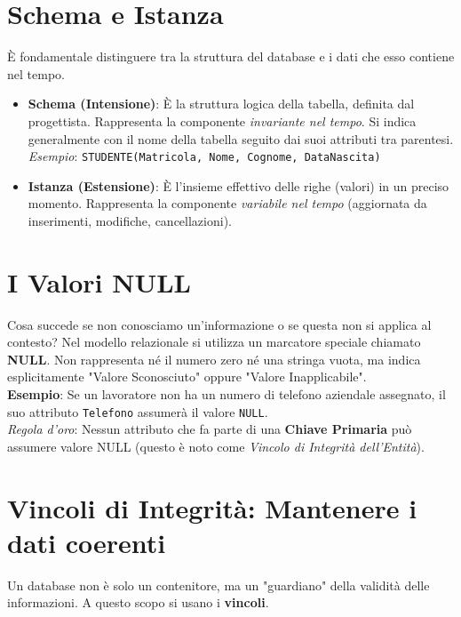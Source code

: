 \section{Schema e Istanza}
È fondamentale distinguere tra la struttura del database e i dati che esso contiene nel tempo.

\begin{itemize}
    \item \textbf{Schema (Intensione)}: È la struttura logica della tabella, definita dal progettista. Rappresenta la componente \textit{invariante nel tempo}. Si indica generalmente con il nome della tabella seguito dai suoi attributi tra parentesi.
    \\[0.1cm] \textit{Esempio}: \texttt{STUDENTE(Matricola, Nome, Cognome, DataNascita)}
    
    \item \textbf{Istanza (Estensione)}: È l'insieme effettivo delle righe (valori) in un preciso momento. Rappresenta la componente \textit{variabile nel tempo} (aggiornata da inserimenti, modifiche, cancellazioni).
\end{itemize}

\section{I Valori NULL}
Cosa succede se non conosciamo un'informazione o se questa non si applica al contesto? Nel modello relazionale si utilizza un marcatore speciale chiamato \textbf{NULL}.
Non rappresenta né il numero zero né una stringa vuota, ma indica esplicitamente "Valore Sconosciuto" oppure "Valore Inapplicabile".
\\[0.2cm]
\textbf{Esempio}: Se un lavoratore non ha un numero di telefono aziendale assegnato, il suo attributo \texttt{Telefono} assumerà il valore \texttt{NULL}. 
\\[0.1cm]
\textit{Regola d'oro}: Nessun attributo che fa parte di una \textbf{Chiave Primaria} può assumere valore NULL (questo è noto come \textit{Vincolo di Integrità dell'Entità}).

\section{Vincoli di Integrità: Mantenere i dati coerenti}
Un database non è solo un contenitore, ma un "guardiano" della validità delle informazioni. A questo scopo si usano i \textbf{vincoli}.

